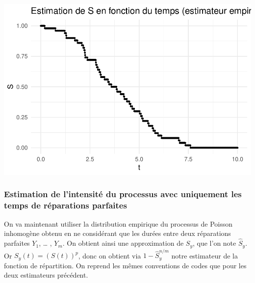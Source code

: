 \documentclass[
]{article}
\begin{document}
\includegraphics{Projet-Poisson_files/figure-latex/unnamed-chunk-7-1.pdf}

\subsubsection{Estimation de l'intensité du processus avec uniquement
les temps de réparations
parfaites}\label{estimation-de-lintensituxe9-du-processus-avec-uniquement-les-temps-de-ruxe9parations-parfaites}

On va maintenant utiliser la distribution empirique du processus de
Poisson inhomogène obtenu en ne considérant que les durées entre deux
réparations parfaites \(Y_1\), \ldots{} , \(Y_m\). On obtient ainsi une
approximation de \(S_y\), que l'on note \(\hat S_y\). Or
\(S_y(t)=(S(t))^p\), donc on obtient via \(1 - \hat S_y ^{n/m}\) notre
estimateur de la fonction de répartition. On reprend les mêmes
conventions de codes que pour les deux estimateurs précédent.
\end{document}

